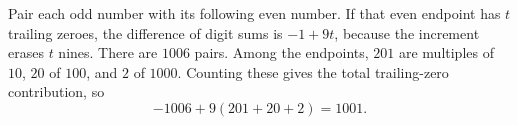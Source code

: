 Pair each odd number with its following even number. If that even endpoint has $t$ trailing zeroes, the difference of digit sums is $-1+9t$, because the increment erases $t$ nines. There are $1006$ pairs. Among the endpoints, $201$ are multiples of $10$, $20$ of $100$, and $2$ of $1000$. Counting these gives the total trailing-zero contribution, so
\[
-1006+9(201+20+2)=\boxed{1001}.
\]

